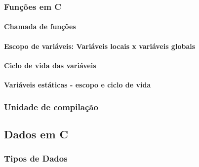\documentclass[
]{article}
\begin{document}
\hypertarget{funuxe7uxf5es-em-c}{%
\subsubsection{Funções em C}\label{funuxe7uxf5es-em-c}}

\hypertarget{chamada-de-funuxe7uxf5es}{%
\paragraph{Chamada de funções}\label{chamada-de-funuxe7uxf5es}}

\hypertarget{escopo-de-variuxe1veis-variuxe1veis-locais-x-variuxe1veis-globais}{%
\paragraph{Escopo de variáveis: Variáveis locais x variáveis
globais}\label{escopo-de-variuxe1veis-variuxe1veis-locais-x-variuxe1veis-globais}}

\hypertarget{ciclo-de-vida-das-variuxe1veis}{%
\paragraph{Ciclo de vida das
variáveis}\label{ciclo-de-vida-das-variuxe1veis}}

\hypertarget{variuxe1veis-estuxe1ticas---escopo-e-ciclo-de-vida}{%
\paragraph{Variáveis estáticas - escopo e ciclo de
vida}\label{variuxe1veis-estuxe1ticas---escopo-e-ciclo-de-vida}}

\hypertarget{unidade-de-compilauxe7uxe3o}{%
\subsubsection{Unidade de
compilação}\label{unidade-de-compilauxe7uxe3o}}

\hypertarget{dados-em-c}{%
\subsection{Dados em C}\label{dados-em-c}}

\hypertarget{tipos-de-dados}{%
\subsubsection{Tipos de Dados}\label{tipos-de-dados}}
\end{document}

